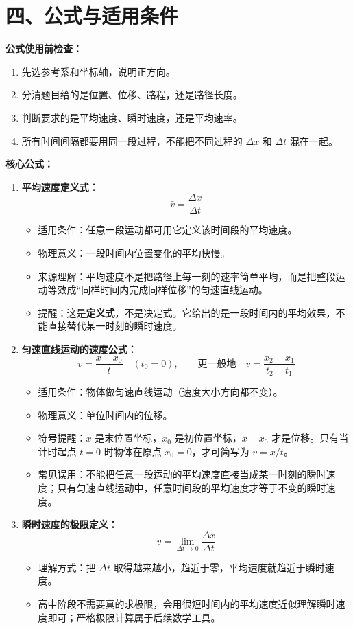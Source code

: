 \section*{四、公式与适用条件}

\textbf{公式使用前检查：}
\begin{enumerate}
  \item 先选参考系和坐标轴，说明正方向。
  \item 分清题目给的是位置、位移、路程，还是路径长度。
  \item 判断要求的是平均速度、瞬时速度，还是平均速率。
  \item 所有时间间隔都要用同一段过程，不能把不同过程的 $\Delta x$ 和 $\Delta t$ 混在一起。
\end{enumerate}

\textbf{核心公式：}

\begin{enumerate}
  \item \textbf{平均速度定义式：}
  \[
  \bar{v} = \frac{\Delta x}{\Delta t}
  \]
  \begin{itemize}
    \item 适用条件：任意一段运动都可用它定义该时间段的平均速度。
    \item 物理意义：一段时间内位置变化的平均快慢。
    \item 来源理解：平均速度不是把路径上每一刻的速率简单平均，而是把整段运动等效成“同样时间内完成同样位移”的匀速直线运动。
    \item 提醒：这是\textbf{定义式}，不是决定式。它给出的是一段时间内的平均效果，不能直接替代某一时刻的瞬时速度。
  \end{itemize}

  \item \textbf{匀速直线运动的速度公式：}
  \[
  v = \frac{x-x_0}{t}\quad (t_0=0),\qquad
  \text{更一般地}\quad v=\frac{x_2-x_1}{t_2-t_1}
  \]
  \begin{itemize}
    \item 适用条件：物体做匀速直线运动（速度大小方向都不变）。
    \item 物理意义：单位时间内的位移。
    \item 符号提醒：$x$ 是末位置坐标，$x_0$ 是初位置坐标，$x-x_0$ 才是位移。只有当计时起点 $t=0$ 时物体在原点 $x_0=0$，才可简写为 $v=x/t$。
    \item 常见误用：不能把任意一段运动的平均速度直接当成某一时刻的瞬时速度；只有匀速直线运动中，任意时间段的平均速度才等于不变的瞬时速度。
  \end{itemize}

  \item \textbf{瞬时速度的极限定义：}
  \[
  v = \lim_{\Delta t \to 0} \frac{\Delta x}{\Delta t}
  \]
  \begin{itemize}
    \item 理解方式：把 $\Delta t$ 取得越来越小，趋近于零，平均速度就趋近于瞬时速度。
    \item 高中阶段不需要真的求极限，会用很短时间内的平均速度近似理解瞬时速度即可；严格极限计算属于后续数学工具。
  \end{itemize}
\end{enumerate}

